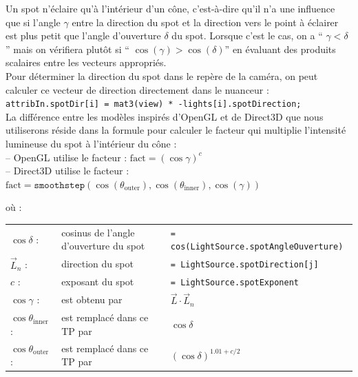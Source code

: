 \documentclass{article}[letterpaper, 11pt]
\begin{document}
Un spot n'éclaire qu'à l'intérieur d'un cône, c'est-à-dire qu'il n'a une influence que si l'angle $\gamma$ entre la direction du spot et la direction vers le point à éclairer est plus petit que l'angle d'ouverture $\delta$ du spot.
Lorsque c'est le cas, on a `` $\gamma < \delta$ '' mais on vérifiera plutôt si `` $\cos(\gamma) > \cos(\delta)$'' en évaluant des produits scalaires entre les vecteurs appropriés.\vspace*{11pt}
\\
Pour déterminer la direction du spot dans le repère de la caméra, on peut calculer ce vecteur de direction
directement dans le nuanceur :\vspace*{11pt}
\\
\texttt{attribIn.spotDir[i] = mat3(view) * -lights[i].spotDirection;}\vspace*{11pt}
\\
La différence entre les modèles inspirés d'OpenGL et de Direct3D que nous utiliserons réside dans la formule pour calculer le facteur qui multiplie l'intensité lumineuse du spot à l'intérieur du cône :\vspace*{11pt}
\\
-- OpenGL utilise le facteur : $\text{fact} = {(\cos \gamma)}^{c}$\vspace*{11pt}
\\
-- Direct3D utilise le facteur : $\text{fact} = \texttt{smoothstep}(\cos(\theta_{\text{outer}}), \cos(\theta_{\text{inner}}), \cos(\gamma))$

où :\\
\begin{tabular}{lll}
	$\cos \delta$ : & cosinus de l'angle d'ouverture du spot & \texttt{= cos(LightSource.spotAngleOuverture)}\\

	$\vec{L}_n$ : & direction du spot & \texttt{= LightSource.spotDirection[j]}\\

	$c$ : & exposant du spot & \texttt{= LightSource.spotExponent}\\

	$\cos \gamma$ : & est obtenu par & $\vec{L} \cdot \vec{L}_n$ \\

	$\cos \theta_{\text{inner}}$ : & est remplacé dans ce TP par & $\cos \delta$\\

	$\cos \theta_{\text{outer}}$ : & est remplacé dans ce TP par & ${(\cos \delta)}^{1.01 + c/2}$\\

\end{tabular}
\end{document}
